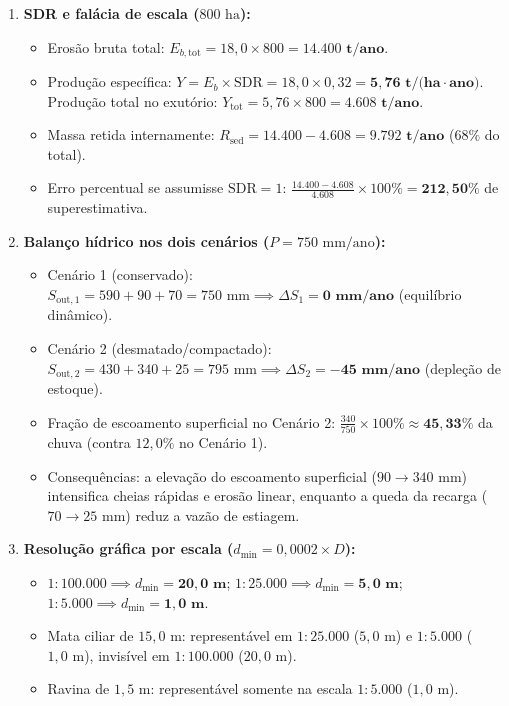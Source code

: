\begin{boxGabarito}
\begin{enumerate}[leftmargin=1.8em, itemsep=4pt]
    \item \textbf{SDR e falácia de escala ($800\text{ ha}$):}
    \begin{itemize}[leftmargin=1.4em, itemsep=1pt]
      \item Erosão bruta total: $E_{b,\text{tot}} = 18{,}0 \times 800 = \mathbf{14.400\text{ t/ano}}$.
      \item Produção específica: $Y = E_b \times \text{SDR} = 18{,}0 \times 0{,}32 = \mathbf{5{,}76\text{ t/(ha}\cdot\text{ano)}}$. Produção total no exutório: $Y_{\text{tot}} = 5{,}76 \times 800 = \mathbf{4.608\text{ t/ano}}$.
      \item Massa retida internamente: $R_{\text{sed}} = 14.400 - 4.608 = \mathbf{9.792\text{ t/ano}}$ ($68\%$ do total).
      \item Erro percentual se assumisse $\text{SDR} = 1$: $\frac{14.400 - 4.608}{4.608} \times 100\% = \mathbf{212{,}50\%}$ de superestimativa.
    \end{itemize}

    \item \textbf{Balanço hídrico nos dois cenários ($P = 750\text{ mm/ano}$):}
    \begin{itemize}[leftmargin=1.4em, itemsep=1pt]
      \item Cenário 1 (conservado): $S_{\text{out},1} = 590 + 90 + 70 = 750\text{ mm} \implies \Delta S_1 = \mathbf{0\text{ mm/ano}}$ (equilíbrio dinâmico).
      \item Cenário 2 (desmatado/compactado): $S_{\text{out},2} = 430 + 340 + 25 = 795\text{ mm} \implies \Delta S_2 = \mathbf{-45\text{ mm/ano}}$ (depleção de estoque).
      \item Fração de escoamento superficial no Cenário 2: $\frac{340}{750} \times 100\% \approx \mathbf{45{,}33\%}$ da chuva (contra $12{,}0\%$ no Cenário 1).
      \item Consequências: a elevação do escoamento superficial ($90 \to 340\text{ mm}$) intensifica cheias rápidas e erosão linear, enquanto a queda da recarga ($70 \to 25\text{ mm}$) reduz a vazão de estiagem.
    \end{itemize}

    \item \textbf{Resolução gráfica por escala ($d_{\min} = 0{,}0002 \times D$):}
    \begin{itemize}[leftmargin=1.4em, itemsep=1pt]
      \item $1{:}100.000 \implies d_{\min} = \mathbf{20{,}0\text{ m}}$; $1{:}25.000 \implies d_{\min} = \mathbf{5{,}0\text{ m}}$; $1{:}5.000 \implies d_{\min} = \mathbf{1{,}0\text{ m}}$.
      \item Mata ciliar de $15{,}0\text{ m}$: representável em $1{:}25.000$ ($5{,}0\text{ m}$) e $1{:}5.000$ ($1{,}0\text{ m}$), invisível em $1{:}100.000$ ($20{,}0\text{ m}$).
      \item Ravina de $1{,}5\text{ m}$: representável somente na escala $1{:}5.000$ ($1{,}0\text{ m}$).
    \end{itemize}


\end{enumerate}
\end{boxGabarito}
